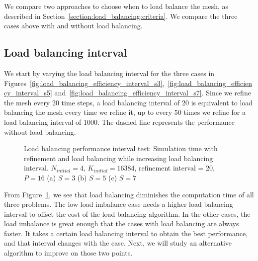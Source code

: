 We compare two approaches to choose when to load balance the mesh, as described in
Section~\ref{section:load_balancing:criteria}. We compare the three cases above with and without
load balancing.

\subsection{Load balancing interval}\label{subsection:results:load_balancing_performance:interval}

We start by varying the load balancing interval for the three cases in
Figures~\ref{fig:load_balancing_efficiency_interval_s3},~\ref{fig:load_balancing_efficiency_interval_s5}
and~\ref{fig:load_balancing_efficiency_interval_s7}. Since we refine the mesh every 20 time steps, a
load balancing interval of 20 is equivalent to load balancing the mesh every time we refine it, up
to every 50 times we refine for a load balancing interval of 1000. The dashed line represents the
performance without load balancing.

\begin{figure}[H]
    \begin{adjustwidth}{-0.5in}{-0.5in}
        \centering
        \hfill
        \hfill
    \end{adjustwidth}
    \caption{Load balancing performance interval test: Simulation time with refinement and load balancing while increasing load balancing interval. \(N_{initial} = 4\), \(K_{initial} = 16384\), refinement interval = 20, \(P = 16\) (a) \(S = 3\) (b) \(S = 5\) (c) \(S = 7\)}\label{fig:load_balancing_efficiency_interval}
\end{figure}

From Figure~\ref{fig:load_balancing_efficiency_interval}, we see that load balancing diminishes the
computation time of all three problems. The low load imbalance case needs a higher load balancing
interval to offset the cost of the load balancing algorithm. In the other cases, the load imbalance
is great enough that the cases with load balancing are always faster. It takes a certain load
balancing interval to obtain the best performance, and that interval changes with the case. Next, we
will study an alternative algorithm to improve on those two points.


